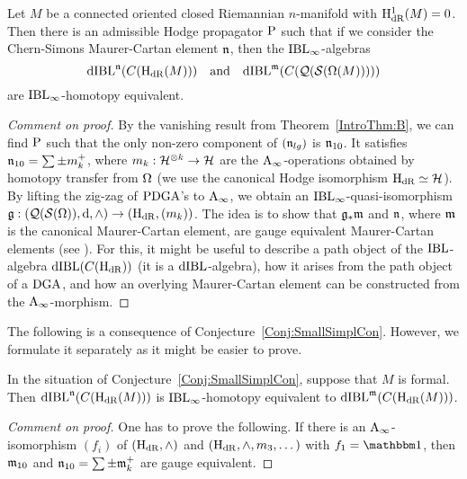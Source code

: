 \documentclass[\MainFolder/Text.tex]{subfiles}
\begin{document}
\begin{Conjecture}\label{Conj:SmallSimplCon}
Let $M$ be a connected oriented closed Riemannian $n$-manifold with $\mathrm{H}_{\mathrm{dR}}^1(M) = 0$. Then there is an admissible Hodge propagator $\mathrm{P}$ such that if we consider the Chern-Simons Maurer-Cartan element $\mathfrak{n}$, then the $\mathrm{IBL}_\infty$-algebras 
$$\mathrm{dIBL}^{\mathfrak{n}}(C(\mathrm{H}_{\mathrm{dR}}(M)))\quad\text{and}\quad\mathrm{dIBL}^{\mathfrak{m}}(C(\mathcal{Q}(\mathcal{S}(\Omega(M))))) $$
are $\mathrm{IBL}_\infty$-homotopy equivalent.
\end{Conjecture}
\begin{proof}[Comment on proof]
By the vanishing result from Theorem~\ref{IntroThm:B}, we can find $\mathrm{P}$ such that the only non-zero component of $(\mathfrak{n}_{lg})$ is $\mathfrak{n}_{10}$.
It satisfies $\mathfrak{n}_{10} = \sum \pm m_k^+$, where $m_k: \mathcal{H}^{\otimes k} \rightarrow \mathcal{H}$ are the $\mathrm{A}_\infty$-operations obtained by homotopy transfer from $\Omega$ (we use the canonical Hodge isomorphism $\mathrm{H}_{\mathrm{dR}}\simeq\mathcal{H}$).
By lifting the zig-zag of $\mathrm{PDGA}$'s to $\mathrm{A}_\infty$, we obtain an $\mathrm{IBL}_\infty$-quasi-isomorphism $\mathfrak{g}: (\mathcal{Q}(\mathcal{S}(\Omega)),\mathrm{d},\wedge) \rightarrow (\mathrm{H}_{\mathrm{dR}},(m_k))$.
The idea is to show that $\mathfrak{g}_*\mathfrak{m}$ and $\mathfrak{n}$, where $\mathfrak{m}$ is the canonical Maurer-Cartan element, are gauge equivalent Maurer-Cartan elements (see \cite[Definition~9.7]{Cieliebak2015}).
For this, it might be useful to describe a path object of the $\mathrm{IBL}$-algebra $\mathrm{dIBL}(C(\mathrm{H}_{\mathrm{dR}}))$ (it is a $\mathrm{dIBL}$-algebra), how it arises from the path object of a $\mathrm{DGA}$, and how an overlying Maurer-Cartan element can be constructed from the $\mathrm{A}_\infty$-morphism.
\end{proof}

The following is a consequence of Conjecture~\ref{Conj:SmallSimplCon}.
However, we formulate it separately as it might be easier to prove.

\begin{Conjecture}\label{Cor:FormCorollary}
In the situation of Conjecture~\ref{Conj:SmallSimplCon}, suppose that $M$ is formal. Then $\mathrm{dIBL}^{\mathfrak{n}}(C(\mathrm{H}_{\mathrm{dR}}(M)))$ is $\mathrm{IBL}_\infty$-homotopy equivalent to $\mathrm{dIBL}^{\mathfrak{m}}(C(\mathrm{H}_{\mathrm{dR}}(M)))$.
\end{Conjecture}
\begin{proof}[Comment on proof]
One has to prove the following. If there is an $\mathrm{A}_\infty$-isomorphism $(f_i)$ of $(\mathrm{H}_{\mathrm{dR}},\wedge)$ and $(\mathrm{H}_{\mathrm{dR}},\wedge,m_3,\dotsc)$ with $f_1 = \Id$, then $\mathfrak{m}_{10}$ and $\mathfrak{n}_{10} = \sum \pm \mathfrak{m}_k^+$ are gauge equivalent.
\end{proof}
\end{document}
